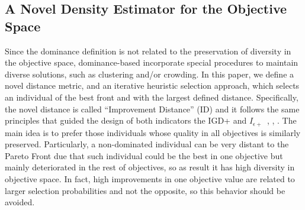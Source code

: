 %
%
%
%
%
%
%

%
%
%
%

\subsection{A Novel Density Estimator for the Objective Space}
\label{subsection:density}

Since the dominance definition is not related to the preservation of diversity in the objective space,
dominance-based \MOEAS{} incorporate special procedures to maintain diverse solutions, such as clustering and/or crowding.
%
In this paper, we define a novel distance metric, and an iterative heuristic selection approach, which selects an individual of the best front and with the largest defined distance.
%
Specifically, the novel distance is called ``Improvement Distance'' (ID) and it 
follows the same principles that guided the design of both indicators the IGD+ and $I_{\epsilon +}$~\cite{Joel:Inverted_Generational_Distance_Plus}, \cite{Joel:IBEA}, \cite{zitzler2003performance}.
%
The main idea is to prefer those individuals whose quality in all objectives is similarly preserved.
%
Particularly, a non-dominated individual can be very distant to the Pareto Front due that such individual could be the best in one objective but mainly deteriorated in the rest of objectives, so as result it has high diversity in objective space.
%
In fact, high improvements in one objective value are related to larger selection probabilities and not the opposite, so this behavior should be avoided.
%

